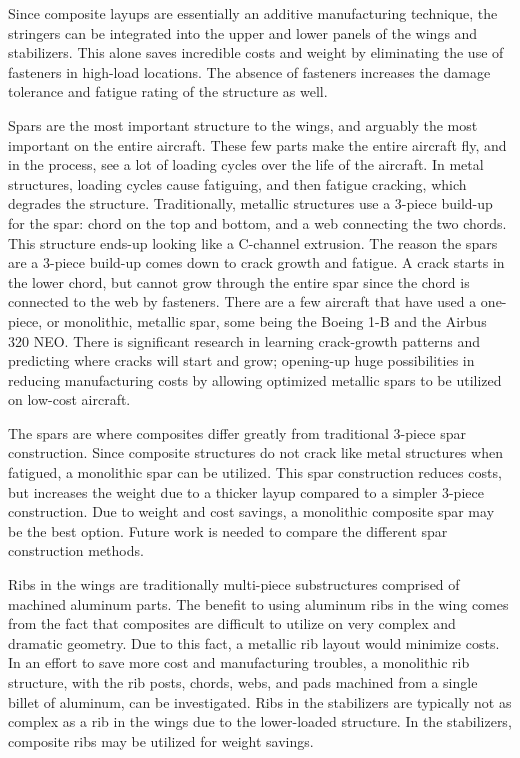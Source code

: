 Since composite layups are essentially an additive manufacturing technique, the stringers can be integrated into the upper and lower panels of the wings and stabilizers. This alone saves incredible costs and weight by eliminating the use of fasteners in high-load locations. The absence of fasteners increases the damage tolerance and fatigue rating of the structure as well.

Spars are the most important structure to the wings, and arguably the most important on the entire aircraft. These few parts make the entire aircraft fly, and in the process, see a lot of loading cycles over the life of the aircraft. In metal structures, loading cycles cause fatiguing, and then fatigue cracking, which degrades the structure. Traditionally, metallic structures use a 3-piece build-up for the spar: chord on the top and bottom, and a web connecting the two chords. This structure ends-up looking like a C-channel extrusion. The reason the spars are a 3-piece build-up comes down to crack growth and fatigue. A crack starts in the lower chord, but cannot grow through the entire spar since the chord is connected to the web by fasteners. There are a few aircraft that have used a one-piece, or monolithic, metallic spar, some being the Boeing 1-B and the Airbus 320 NEO. There is significant research in learning crack-growth patterns and predicting where cracks will start and grow; opening-up huge possibilities in reducing manufacturing costs by allowing optimized metallic spars to be utilized on low-cost aircraft.

\newpage
The spars are where composites differ greatly from traditional 3-piece spar construction. Since composite structures do not crack like metal structures when fatigued, a monolithic spar can be utilized. This spar construction reduces costs, but increases the weight due to a thicker layup compared to a simpler 3-piece construction. Due to weight and cost savings, a monolithic composite spar may be the best option. Future work is needed to compare the different spar construction methods.

Ribs in the wings are traditionally multi-piece substructures comprised of machined aluminum parts. The benefit to using aluminum ribs in the wing comes from the fact that composites are difficult to utilize on very complex and dramatic geometry. Due to this fact, a metallic rib layout would minimize costs. In an effort to save more cost and manufacturing troubles, a monolithic rib structure, with the rib posts, chords, webs, and pads machined from a single billet of aluminum, can be investigated. Ribs in the stabilizers are typically not as complex as a rib in the wings due to the lower-loaded structure. In the stabilizers, composite ribs may be utilized for weight savings.

